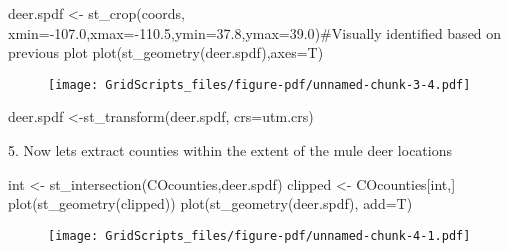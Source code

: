 \documentclass[
  letterpaper,
]{book}
\newenvironment{Shaded}{\begin{snugshade}}{\end{snugshade}}
\newcommand{\AttributeTok}[1]{\textcolor[rgb]{0.40,0.45,0.13}{#1}}
\newcommand{\CommentTok}[1]{\textcolor[rgb]{0.37,0.37,0.37}{#1}}
\newcommand{\FloatTok}[1]{\textcolor[rgb]{0.68,0.00,0.00}{#1}}
\newcommand{\FunctionTok}[1]{\textcolor[rgb]{0.28,0.35,0.67}{#1}}
\newcommand{\NormalTok}[1]{\textcolor[rgb]{0.00,0.23,0.31}{#1}}
\newcommand{\OtherTok}[1]{\textcolor[rgb]{0.00,0.23,0.31}{#1}}
\newcommand{\SpecialCharTok}[1]{\textcolor[rgb]{0.37,0.37,0.37}{#1}}
\begin{document}
\begin{Shaded}
\begin{Highlighting}[]
\NormalTok{deer.spdf }\OtherTok{\textless{}{-}} \FunctionTok{st\_crop}\NormalTok{(coords, }\AttributeTok{xmin=}\SpecialCharTok{{-}}\FloatTok{107.0}\NormalTok{,}\AttributeTok{xmax=}\SpecialCharTok{{-}}\FloatTok{110.5}\NormalTok{,}\AttributeTok{ymin=}\FloatTok{37.8}\NormalTok{,}\AttributeTok{ymax=}\FloatTok{39.0}\NormalTok{)}\CommentTok{\#Visually identified based on previous plot}
\FunctionTok{plot}\NormalTok{(}\FunctionTok{st\_geometry}\NormalTok{(deer.spdf),}\AttributeTok{axes=}\NormalTok{T)}
\end{Highlighting}
\end{Shaded}

\begin{figure}[H]

{\centering \texttt{[image: GridScripts\_files/figure-pdf/unnamed-chunk-3-4.pdf]}

}

\end{figure}

\begin{Shaded}
\begin{Highlighting}[]
\NormalTok{deer.spdf }\OtherTok{\textless{}{-}}\FunctionTok{st\_transform}\NormalTok{(deer.spdf, }\AttributeTok{crs=}\NormalTok{utm.crs)}
\end{Highlighting}
\end{Shaded}

5. Now lets extract counties within the extent of the mule deer
locations

\begin{Shaded}
\begin{Highlighting}[]
\NormalTok{int }\OtherTok{\textless{}{-}} \FunctionTok{st\_intersection}\NormalTok{(COcounties,deer.spdf)}
\NormalTok{clipped }\OtherTok{\textless{}{-}}\NormalTok{ COcounties[int,]}
\FunctionTok{plot}\NormalTok{(}\FunctionTok{st\_geometry}\NormalTok{(clipped))}
\FunctionTok{plot}\NormalTok{(}\FunctionTok{st\_geometry}\NormalTok{(deer.spdf), }\AttributeTok{add=}\NormalTok{T)}
\end{Highlighting}
\end{Shaded}

\begin{figure}[H]

{\centering \texttt{[image: GridScripts\_files/figure-pdf/unnamed-chunk-4-1.pdf]}

}

\end{figure}
\end{document}
